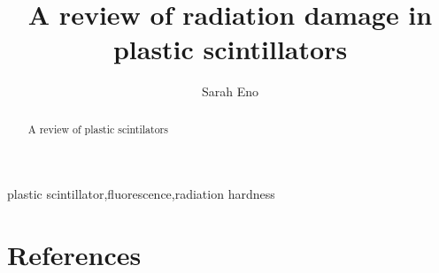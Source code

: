 \documentclass[review]{elsarticle}
\begin{document}
\begin{frontmatter}

\title{A review of radiation damage in plastic scintillators}


\author[umd]{Sarah Eno}



\address[umd]{Dept. Physics, U. Maryland, College Park MD 30742 USA}

\begin{abstract}
A review of plastic scintilators
\end{abstract}

\begin{keyword}
plastic scintillator\sep fluorescence\sep radiation hardness
\end{keyword}

\end{frontmatter}

\linenumbers



\section*{References}


\end{document}
